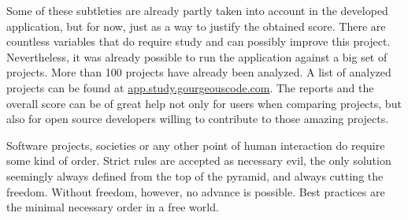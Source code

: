 Some of these subtleties are already partly taken into account in the developed application, but for now, just as a way to justify the obtained score. 
There are countless variables that do require study and can possibly improve this project.
Nevertheless, it was already possible to run the application against a big set of projects.
More than 100 projects have already been analyzed.
A list of analyzed projects can be found at \url{app.study.gourgeouscode.com}.
The reports and the overall score can be of great help not only for users when comparing projects,
but also for open source developers willing to contribute to those amazing projects.

Software projects, societies or any other point of human interaction do require some kind of order.
Strict rules are accepted as necessary evil, the only solution seemingly always defined from the top of the pyramid,
and always cutting the freedom.
Without freedom, however, no advance is possible.
Best practices are the minimal necessary order in a free world.

